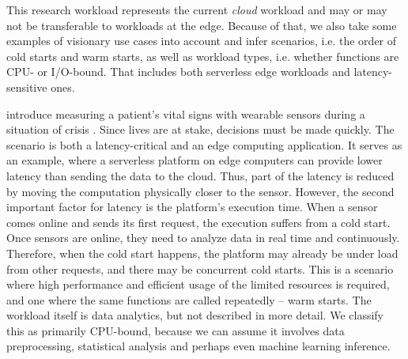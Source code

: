 This research workload represents the current \emph{cloud} workload and may or may not be transferable to workloads at the edge. Because of that, we also take some examples of visionary use cases into account and infer scenarios, i.e. the order of cold starts and warm starts, as well as workload types, i.e. whether functions are CPU- or I/O-bound. That includes both serverless edge workloads and latency-sensitive ones.



\begin{description}[style=multiline, leftmargin=2.5cm, font=\bfseries]

    \item[Vital Signs Analysis] \citeauthor{Nastic2017} introduce measuring a patient's vital signs with wearable sensors during a situation of crisis \cite{Nastic2017}. Since lives are at stake, decisions must be made quickly. The scenario is both a latency-critical and an edge computing application. It serves as an example, where a serverless platform on edge computers can provide lower latency than sending the data to the cloud. Thus, part of the latency is reduced by moving the computation physically closer to the sensor. However, the second important factor for latency is the platform's execution time. When a sensor comes online and sends its first request, the execution suffers from a cold start. Once sensors are online, they need to analyze data in real time and continuously. Therefore, when the cold start happens, the platform may already be under load from other requests, and there may be concurrent cold starts. This is a scenario where high performance and efficient usage of the limited resources is required, and one where the same functions are called repeatedly -- warm starts.
    The workload itself is data analytics, but not described in more detail. We classify this as primarily CPU-bound, because we can assume it involves data preprocessing, statistical analysis and perhaps even machine learning inference.


\end{description}
